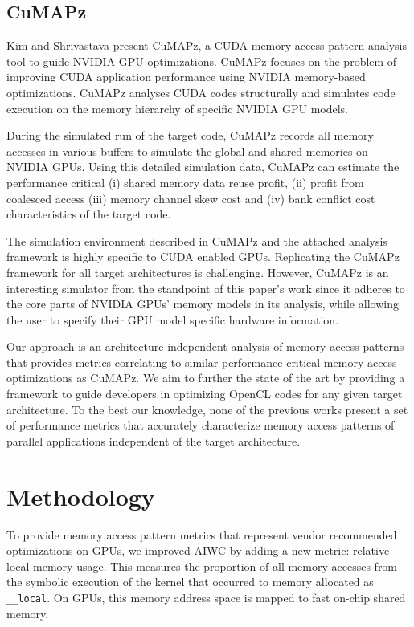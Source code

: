 \documentclass[review=false, sigchi]{acmart}
\begin{document}
	\subsection{CuMAPz}
	
	Kim and Shrivastava \cite{kim2011cumapz} present CuMAPz, a CUDA memory access pattern analysis tool to guide NVIDIA GPU optimizations. CuMAPz focuses on the problem of improving CUDA application performance using NVIDIA memory-based optimizations. CuMAPz analyses CUDA codes structurally and simulates code execution on the memory hierarchy of specific NVIDIA GPU models.
	
	During the simulated run of the target code, CuMAPz records all memory accesses in various buffers to simulate the global and shared memories on NVIDIA GPUs. Using this detailed simulation data, CuMAPz can estimate the performance critical (i) shared memory data reuse profit, (ii) profit from coalesced access (iii) memory channel skew cost and (iv) bank conflict cost characteristics of the target code.
	
	The simulation environment described in CuMAPz and the attached analysis framework is highly specific to CUDA enabled GPUs. Replicating the CuMAPz framework for all target architectures is challenging. However, CuMAPz is an interesting simulator from the standpoint of this paper's work since it adheres to the core parts of NVIDIA GPUs' memory models in its analysis, while allowing the user to specify their GPU model specific hardware information.
	
	Our approach is an architecture independent analysis of memory access patterns that provides metrics correlating to similar performance critical memory access optimizations as CuMAPz. We aim to further the state of the art by providing a framework to guide developers in optimizing OpenCL codes for any given target architecture. To the best our knowledge, none of the previous works present a set of performance metrics that accurately characterize memory access patterns of parallel applications independent of the target architecture.
	
	\section{Methodology} \label{method}
	
	To provide memory access pattern metrics that represent vendor recommended optimizations on GPUs, we improved AIWC by adding a new metric: relative local memory usage. This measures the proportion of all memory accesses from the symbolic execution of the kernel that occurred to memory allocated as \texttt{\_\_local}. On GPUs, this memory address space is mapped to fast on-chip shared memory.
	
\end{document}
